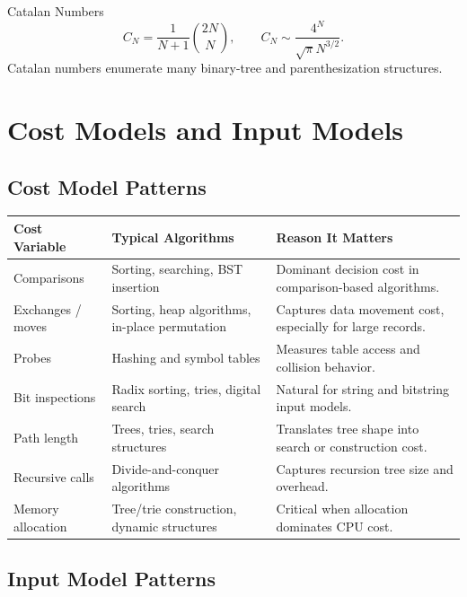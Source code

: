 \documentclass[11pt]{article}
\begin{document}
\begin{mathbox}{Catalan Numbers}
\[
C_N = \frac{1}{N+1}\binom{2N}{N},
\qquad
C_N \sim \frac{4^N}{\sqrt{\pi}N^{3/2}}.
\]
Catalan numbers enumerate many binary-tree and parenthesization structures.
\end{mathbox}

\section{Cost Models and Input Models}

\subsection{Cost Model Patterns}

\begin{center}
\begin{tabularx}{\textwidth}{L{0.22\textwidth} L{0.28\textwidth} Y}
\toprule
\textbf{Cost Variable} & \textbf{Typical Algorithms} & \textbf{Reason It Matters} \\
\midrule
Comparisons & Sorting, searching, BST insertion & Dominant decision cost in comparison-based algorithms. \\
Exchanges / moves & Sorting, heap algorithms, in-place permutation & Captures data movement cost, especially for large records. \\
Probes & Hashing and symbol tables & Measures table access and collision behavior. \\
Bit inspections & Radix sorting, tries, digital search & Natural for string and bitstring input models. \\
Path length & Trees, tries, search structures & Translates tree shape into search or construction cost. \\
Recursive calls & Divide-and-conquer algorithms & Captures recursion tree size and overhead. \\
Memory allocation & Tree/trie construction, dynamic structures & Critical when allocation dominates CPU cost. \\
\bottomrule
\end{tabularx}
\end{center}

\subsection{Input Model Patterns}
\end{document}
